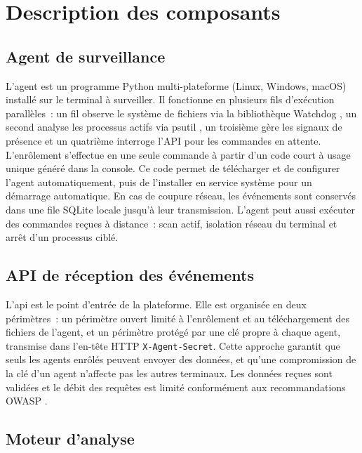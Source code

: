 \section{Description des composants}

\subsection{Agent de surveillance}

L'\gls{agent} est un programme Python multi-plateforme (Linux, Windows, macOS) installé sur le terminal à surveiller. Il fonctionne en plusieurs fils d'exécution parallèles~: un fil observe le système de fichiers via la bibliothèque Watchdog \cite{watchdogDocs}, un second analyse les processus actifs via psutil \cite{psutilDocs}, un troisième gère les signaux de présence et un quatrième interroge l'API pour les commandes en attente. L'enrôlement s'effectue en une seule commande à partir d'un code court à usage unique généré dans la console. Ce code permet de télécharger et de configurer l'agent automatiquement, puis de l'installer en service système pour un démarrage automatique. En cas de coupure réseau, les événements sont conservés dans une file SQLite locale jusqu'à leur transmission. L'agent peut aussi exécuter des commandes reçues à distance~: scan actif, isolation réseau du terminal et arrêt d'un processus ciblé.

\subsection{API de réception des événements}

L'\gls{api} est le point d'entrée de la plateforme. Elle est organisée en deux périmètres~: un périmètre ouvert limité à l'enrôlement et au téléchargement des fichiers de l'agent, et un périmètre protégé par une clé propre à chaque agent, transmise dans l'en-tête HTTP \texttt{X-Agent-Secret}. Cette approche garantit que seuls les agents enrôlés peuvent envoyer des données, et qu'une compromission de la clé d'un agent n'affecte pas les autres terminaux. Les données reçues sont validées et le débit des requêtes est limité conformément aux recommandations OWASP \cite{owaspRestSecurity,owaspApiSecurity}.

\subsection{Moteur d'analyse}

